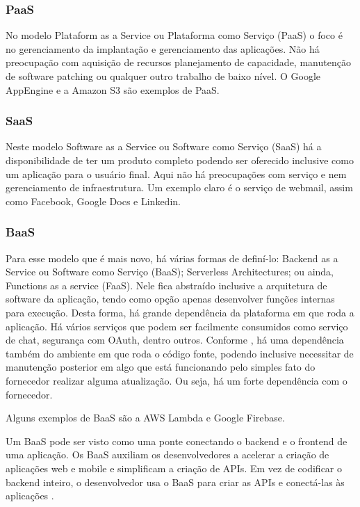 
\subsubsection{PaaS}\label{paas}

No modelo Plataform as a Service ou Plataforma como Serviço (PaaS)
o foco é no gerenciamento da implantação e gerenciamento das aplicações.
Não há preocupação com aquisição de recursos planejamento de capacidade, manutenção de
software patching ou qualquer outro trabalho de baixo nível. O Google AppEngine e a
Amazon S3 são exemplos de PaaS.

\subsubsection{SaaS}\label{saas}

Neste modelo Software as a Service ou Software como Serviço (SaaS)
há a disponibilidade de ter um produto completo podendo ser oferecido
inclusive como um aplicação para o usuário final. Aqui não há preocupações com serviço
e nem gerenciamento de infraestrutura. Um exemplo claro é o serviço de webmail, assim
como Facebook, Google Docs e Linkedin.

\subsubsection{BaaS}\label{baas}

Para esse modelo que é mais novo, há várias formas de definí-lo:
Backend as a Service ou Software como Serviço (BaaS); Serverless Architectures; ou ainda,
Functions as a service (FaaS).
Nele fica abstraído inclusive a arquitetura de software da aplicação,
tendo como opção apenas desenvolver funções internas para execução. Desta forma, há grande
dependência da plataforma em que roda a aplicação.
Há vários serviços que podem ser facilmente consumidos como serviço de chat, segurança com
OAuth, dentro outros.
Conforme \cite{martin-serverless}, há uma dependência também do ambiente em que roda o
código fonte, podendo inclusive necessitar de manutenção posterior em algo que está
funcionando pelo simples fato do fornecedor realizar alguma atualização.
Ou seja, há um forte dependência com o fornecedor.

Alguns exemplos de BaaS são a AWS Lambda e Google Firebase.

\begin{citacao}
Um BaaS pode ser visto como uma ponte conectando o backend e o frontend de uma aplicação.
Os BaaS auxiliam os desenvolvedores a acelerar a criação de aplicações web e mobile e
simplificam a criação de APIs. Em vez de codificar o backend inteiro, o desenvolvedor usa
o BaaS para criar as APIs e conectá-las às aplicações \cite{backend-as-a-service-pros-e-contras}.
\end{citacao}


